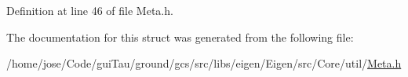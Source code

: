 Definition at line 46 of file Meta.\-h.



The documentation for this struct was generated from the following file\-:\begin{DoxyCompactItemize}
\item 
/home/jose/\-Code/gui\-Tau/ground/gcs/src/libs/eigen/\-Eigen/src/\-Core/util/\hyperlink{_meta_8h}{Meta.\-h}\end{DoxyCompactItemize}
